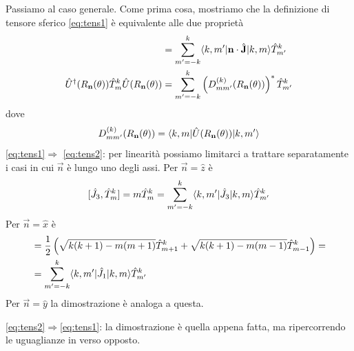 \documentclass[a4paper, 11pt]{article}
\newcommand{\op}[1]{\hat{#1}}
\renewcommand{\op}[1]{\hat{#1}}
\begin{document}
Passiamo al caso generale. Come prima cosa, mostriamo che la definizione di tensore sferico \ref{eq:tens1} è equivalente alle due proprietà
\begin{align}
	[\vec{n}\cdot\op{\vec{J}},\op T^k_m]&=\sum_{m'=-k}^{k}\braketop{k,m'}{\vec{n}\cdot\op{\vec{J}}}{k,m}\op T^k_{m'}\label{eq:tens2}\\
	\op U^\dagger(R_\vec{n}(\theta))\op T^k_m\op U(R_\vec{n}(\theta))&=\sum_{m'=-k}^{k}\left(D^{(k)}_{mm'}(R_\vec{n}(\theta))\right)^*\op T^k_{m'}\label{eq:tens3}
\end{align}
dove
\[D^{(k)}_{mm'}(R_\vec{n}(\theta))=\braketop{k,m}{\op U(R_\vec{n}(\theta))}{k,m'}\]
\ref{eq:tens1}$\Rightarrow$ \ref{eq:tens2}: per linearità possiamo limitarci a trattare separatamente i casi in cui $\vec{n}$ è lungo uno degli assi. Per $\vec{n}=\hat{z}$ è
\[[\op J_3,\op T^k_m]=m\op T^k_m=\sum_{m'=-k}^{k}\braketop{k,m'}{\op J_3}{k,m}\op T^k_{m'}\]
Per $\vec{n}=\hat{x}$ è
\begin{align*}[\op J_1,\op T^k_m]&=\frac{1}{2}\left(\sqrt{k(k+1)-m(m+1)}\op T^k_{m+1}+\sqrt{k(k+1)-m(m-1)}\op T^k_{m-1}\right)=\\&=\sum_{m'=-k}^k\braketop{k,m'}{\op J_1}{k,m}\op T^k_{m'}\end{align*}
Per $\vec{n}=\hat{y}$ la dimostrazione è analoga a questa.

\ref{eq:tens2}$\Rightarrow$\ref{eq:tens1}: la dimostrazione è quella appena fatta, ma ripercorrendo le uguaglianze in verso opposto.
\end{document}
